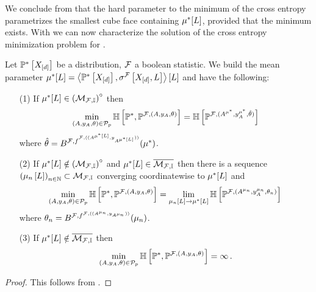We conclude from  that the hard parameter to the minimum of the cross entropy parametrizes the smallest cube face containing $\mu^*[L]$, provided that the minimum exists.
With  we can now characterize the solution of the cross entropy minimization problem  for \HybridLogicNetworks{}.

\begin{theorem}
    \label{the:minCrossEntropyHLN}
    Let $\mathbb{P}^*\left[X_{[d]}\right]$ be a distribution, $\mathcal{F}$ a boolean statistic.%
    We build the mean parameter $\mu^*[L]=\left\langle \mathbb{P}^*\left[X_{[d]}\right],\sigma^{\mathcal{F}}\left[X_{[d]},L\right]\right\rangle \left[ L \right]$ and have the following:
    \begin{itemize}
        \item[(1)] If $\mu^*[L] \in {\left(\mathcal{M}_{\mathcal{F},\mathbb{I}}\right)}^{\circ}$ then
        \begin{align*}
            \min_{(A,y_{A},\theta)\in\mathcal{P}_{p}} \mathbb{H}\left[\mathbb{P}^*,\mathbb{P}^{\mathcal{F},(A,y_{A},\theta)}\right]
            = \mathbb{H}\left[\mathbb{P}^{\mathcal{F},(A^{\mu^*},y_{A}^{\mu^*},\hat{\theta})}\right]
        \end{align*}
        where $\hat{\theta}=B^{\mathcal{F},f^{\mathcal{F},((A^{\mu^*[L]},y_{A^{\mu^*[L]}}))}}(\mu^*)$.
        \item[(2)] If $\mu^*[L] \notin {\left(\mathcal{M}_{\mathcal{F},\mathbb{I}}\right)}^{\circ}$ and $\mu^*[L]\in\overline{\mathcal{M}_{\mathcal{F},\mathbb{I}}}$ then there is a sequence $\left(\mu_{n}\left[L\right]\right)_{n\in\mathbb{N}}\subset\mathcal{M}_{\mathcal{F},\mathbb{I}}$ converging coordinatewise to $\mu^*[L]$ and
        \begin{align*}
            \min_{(A,y_{A},\theta)\in\mathcal{P}_{p}} \mathbb{H}\left[\mathbb{P}^*,\mathbb{P}^{\mathcal{F},(A,y_{A},\theta)}\right]
            = \lim_{\mu_{n}\left[L\right]\rightarrow\mu^*[L]}
            \mathbb{H}\left[\mathbb{P}^{\mathcal{F},(A^{\mu_{n}},y_{A}^{\mu_{n}},\theta_{n})}\right]\,
        \end{align*}
        where $\theta_{n}=B^{\mathcal{F},f^{\mathcal{F},((A^{\mu_{n}},y_{A^{\mu_{n}}}))}}(\mu_{n})$.
        \item[(3)] If $\mu^*[L]\notin\overline{\mathcal{M}_{\mathcal{F},\mathbb{I}}}$ then
        \begin{align*}
            \min_{(A,y_{A},\theta)\in\mathcal{P}_{p}} \mathbb{H}\left[\mathbb{P}^*,\mathbb{P}^{\mathcal{F},(A,y_{A},\theta)}\right]
            = \infty \, .
        \end{align*}
    \end{itemize}
\end{theorem}
\begin{proof}
    This follows from .
\end{proof}

